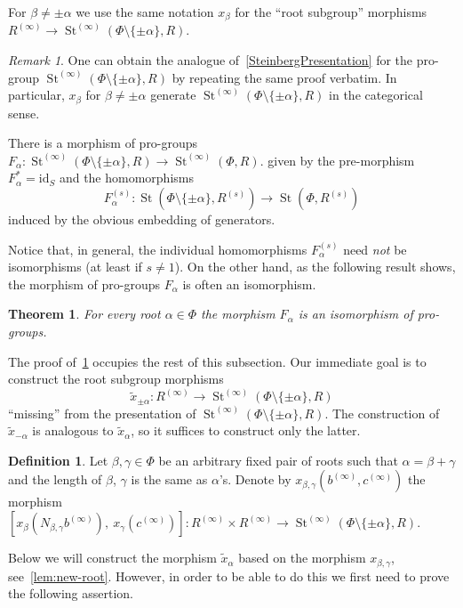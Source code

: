 \documentclass[oneside, 11pt]{amsart}
\numberwithin{equation}{section}
\newtheorem{theorem}{Theorem}
\theoremstyle{definition}
\newtheorem{df}[lemma]{Definition} \Crefname{df}{Definition}{Definitions}
\theoremstyle{remark}
\newtheorem{rem}[lemma]{Remark}
\DeclareMathOperator\St{St}
\begin{document}
For $\beta \neq \pm\alpha$ we use the same notation $x_\beta$ for the ``root subgroup'' morphisms $R^{(\infty)}\to \St^{(\infty)}(\Phi \setminus\{\pm\alpha\}, R)$.
\begin{rem} \label{rem:xpma-presentation}
 One can obtain the analogue of~\cref{SteinbergPresentation} for the pro-group $\St^{(\infty)}(\Phi\setminus\{\pm\alpha\}, R)$ by repeating the same proof verbatim. In particular, $x_\beta$ for $\beta\neq \pm\alpha$ generate $\St^{(\infty)}(\Phi\setminus\{\pm\alpha\}, R)$ in the categorical sense.
\end{rem}
There is a morphism of pro-groups
$F_\alpha \colon \St^{(\infty)}(\Phi \setminus\{\pm\alpha\}, R) \to \St^{(\infty)}(\Phi, R).$
given by the pre-morphism $F_\alpha^{*} = \mathrm{id}_S$ and the homomorphisms \[F_\alpha^{(s)} \colon \St(\Phi \setminus\{\pm\alpha\}, R^{(s)}) \to \St(\Phi, R^{(s)})\] induced by the obvious embedding of generators.

Notice that, in general, the individual homomorphisms $F_\alpha^{(s)}$ need {\it not} be isomorphisms (at least if $s \neq 1$). On the other hand, as the following result shows, the morphism of pro-groups $F_\alpha$ is often an isomorphism. 
\begin{theorem}\label{SingleRootElimination} For every root \(\alpha \in \Phi\) the morphism $F_\alpha$ is an isomorphism of pro-groups. \end{theorem}
The proof of~\cref{SingleRootElimination} occupies the rest of this subsection.
Our immediate goal is to construct the root subgroup morphisms
\[\widetilde x_{\pm \alpha} \colon R^{(\infty)} \to \St^{(\infty)}(\Phi \setminus \{\pm \alpha\}, R) \] ``missing'' from the presentation of $\St^{(\infty)}(\Phi\setminus\{\pm\alpha\}, R)$. The construction of $\widetilde{x}_{-\alpha}$ is analogous to $\widetilde{x}_\alpha$, so it suffices to construct only the latter.

\begin{df} \label{def:xbg}
Let $\beta, \gamma \in \Phi$ be an arbitrary fixed pair of roots such that $\alpha = \beta+\gamma$ and the length of $\beta$, $\gamma$ is the same as $\alpha$'s. 
Denote by $x_{\beta,\gamma}(b^{(\infty)}, c^{(\infty)})$ the morphism
 $[x_\beta(N_{\beta,\gamma}b^{(\infty)}),\ x_\gamma(c^{(\infty)})]\colon R^{(\infty)} \times R^{(\infty)} \to \St^{(\infty)}(\Phi \setminus\{\pm\alpha\}, R).$
\end{df}
Below we will construct the morphism $\widetilde x_\alpha$ based on the morphism $x_{\beta,\gamma}$, see~\cref{lem:new-root}. However, in order to be able to do this we first need to prove the following assertion.
\end{document}
